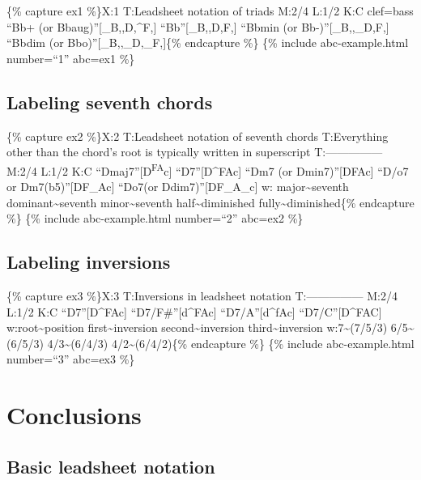 \documentclass{book}
\begin{document}
\{\% capture ex1 \%\}X:1 T:Leadsheet notation of triads M:2/4 L:1/2 K:C
clef=bass ``Bb+ (or Bbaug)''{[}\_B,,D,\^{}F,{]}\textbar{}
``Bb''{[}\_B,,D,F,{]}\textbar{} ``Bbmin (or Bb-)''{[}\_B,,\_D,F,{]}\textbar{}
``Bbdim (or Bbo)''{[}\_B,,\_D,\_F,{]}\textbar\textbar\{\% endcapture \%\} \{\%
include abc-example.html number=``1'' abc=ex1 \%\}

\hypertarget{labeling-seventh-chords}{%
\subsection{Labeling seventh chords}\label{labeling-seventh-chords}}

\{\% capture ex2 \%\}X:2 T:Leadsheet notation of seventh chords T:Everything
other than the chord's root is typically written in superscript
T:--------------- M:2/4 L:1/2 K:C
``Dmaj7''{[}D\textsuperscript{FA}c{]}\textbar{} ``D7''{[}D\^{}FAc{]}\textbar{}
``Dm7 (or Dmin7)''{[}DFAc{]}\textbar{} ``D/o7 or
Dm7(b5)''{[}DF\_Ac{]}\textbar{} ``Do7(or
Ddim7)''{[}DF\_A\_c{]}\textbar\textbar{} w: major\textasciitilde seventh
dominant\textasciitilde seventh minor\textasciitilde seventh
half\textasciitilde diminished fully\textasciitilde diminished\{\% endcapture
\%\} \{\% include abc-example.html number=``2'' abc=ex2 \%\}

\hypertarget{labeling-inversions}{%
\subsection{Labeling inversions}\label{labeling-inversions}}

\{\% capture ex3 \%\}X:3 T:Inversions in leadsheet notation T:---------------
M:2/4 L:1/2 K:C ``D7''{[}D\^{}FAc{]}\textbar{}
``D7/F\#''{[}d\^{}FAc{]}\textbar{} ``D7/A''{[}d\^{}fAc{]}\textbar{}
``D7/C''{[}D\^{}FAC{]}\textbar{} w:root\textasciitilde position
first\textasciitilde inversion second\textasciitilde inversion
third\textasciitilde inversion w:7\textasciitilde(7/5/3)
6/5\textasciitilde(6/5/3) 4/3\textasciitilde(6/4/3)
4/2\textasciitilde(6/4/2)\{\% endcapture \%\} \{\% include abc-example.html
number=``3'' abc=ex3 \%\}

\hypertarget{conclusions-59}{%
\section{Conclusions}\label{conclusions-59}}

\hypertarget{basic-leadsheet-notation}{%
\subsection{Basic leadsheet notation}\label{basic-leadsheet-notation}}
\end{document}
